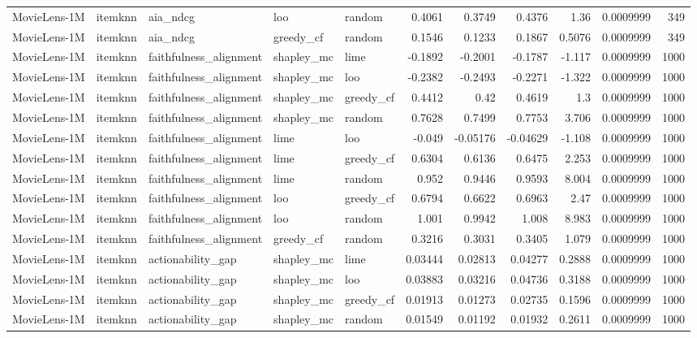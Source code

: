 \begin{table}[t]
\begin{tabular}{lllllrrrrrr}
MovieLens-1M & itemknn & aia\_ndcg & loo & random & 0.4061 & 0.3749 & 0.4376 & 1.36 & 0.0009999 & 349 \\
MovieLens-1M & itemknn & aia\_ndcg & greedy\_cf & random & 0.1546 & 0.1233 & 0.1867 & 0.5076 & 0.0009999 & 349 \\
MovieLens-1M & itemknn & faithfulness\_alignment & shapley\_mc & lime & -0.1892 & -0.2001 & -0.1787 & -1.117 & 0.0009999 & 1000 \\
MovieLens-1M & itemknn & faithfulness\_alignment & shapley\_mc & loo & -0.2382 & -0.2493 & -0.2271 & -1.322 & 0.0009999 & 1000 \\
MovieLens-1M & itemknn & faithfulness\_alignment & shapley\_mc & greedy\_cf & 0.4412 & 0.42 & 0.4619 & 1.3 & 0.0009999 & 1000 \\
MovieLens-1M & itemknn & faithfulness\_alignment & shapley\_mc & random & 0.7628 & 0.7499 & 0.7753 & 3.706 & 0.0009999 & 1000 \\
MovieLens-1M & itemknn & faithfulness\_alignment & lime & loo & -0.049 & -0.05176 & -0.04629 & -1.108 & 0.0009999 & 1000 \\
MovieLens-1M & itemknn & faithfulness\_alignment & lime & greedy\_cf & 0.6304 & 0.6136 & 0.6475 & 2.253 & 0.0009999 & 1000 \\
MovieLens-1M & itemknn & faithfulness\_alignment & lime & random & 0.952 & 0.9446 & 0.9593 & 8.004 & 0.0009999 & 1000 \\
MovieLens-1M & itemknn & faithfulness\_alignment & loo & greedy\_cf & 0.6794 & 0.6622 & 0.6963 & 2.47 & 0.0009999 & 1000 \\
MovieLens-1M & itemknn & faithfulness\_alignment & loo & random & 1.001 & 0.9942 & 1.008 & 8.983 & 0.0009999 & 1000 \\
MovieLens-1M & itemknn & faithfulness\_alignment & greedy\_cf & random & 0.3216 & 0.3031 & 0.3405 & 1.079 & 0.0009999 & 1000 \\
MovieLens-1M & itemknn & actionability\_gap & shapley\_mc & lime & 0.03444 & 0.02813 & 0.04277 & 0.2888 & 0.0009999 & 1000 \\
MovieLens-1M & itemknn & actionability\_gap & shapley\_mc & loo & 0.03883 & 0.03216 & 0.04736 & 0.3188 & 0.0009999 & 1000 \\
MovieLens-1M & itemknn & actionability\_gap & shapley\_mc & greedy\_cf & 0.01913 & 0.01273 & 0.02735 & 0.1596 & 0.0009999 & 1000 \\
MovieLens-1M & itemknn & actionability\_gap & shapley\_mc & random & 0.01549 & 0.01192 & 0.01932 & 0.2611 & 0.0009999 & 1000 \\

\end{tabular}
\end{table}
